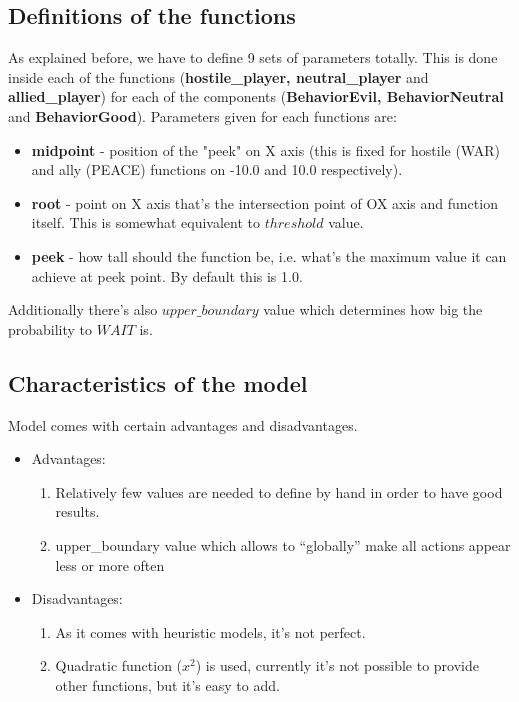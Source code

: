\subsection{Definitions of the functions}
	As explained before, we have to define 9 sets of parameters totally. 
	This is done inside each of the functions (\textbf{hostile\_player, neutral\_player} and \textbf{allied\_player}) for each of the components (\textbf{BehaviorEvil, BehaviorNeutral} and \textbf{BehaviorGood}). 
	Parameters given for each functions are:
	\begin{itemize}
		\item \textbf{midpoint} - position of the "peek" on X axis (this is fixed for hostile (WAR) and ally (PEACE) functions on -10.0 and 10.0 respectively).
		\item \textbf{root} - point on X axis that's the intersection point of OX axis and function itself. This is somewhat equivalent to $threshold$ value.
		\item \textbf{peek} - how tall should the function be, i.e. what's the maximum value it can achieve at peek point. By default this is 1.0.
	\end{itemize}

	Additionally there's also $upper\_boundary$ value which determines how big the probability to $WAIT$ is.

\subsection{Characteristics of the model}
	Model comes with certain advantages and disadvantages.
	\begin{itemize}
		\item Advantages:
			\begin{enumerate}
				\item Relatively few values are needed to define by hand in order to have good results.
				\item upper\_boundary value which allows to ``globally'' make all actions appear less or more often
			\end{enumerate}
		\item Disadvantages:
			\begin{enumerate}
				\item As it comes with heuristic models, it's not perfect.
				\item Quadratic function ($x^{2}$) is used, currently it's not possible to provide other functions, but it's easy to add.
			\end{enumerate}
	\end{itemize}

